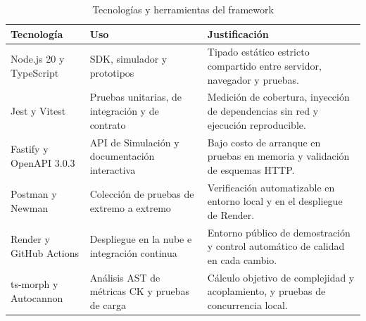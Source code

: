 \begin{table}[H]
  \centering
  \small
  \renewcommand{\arraystretch}{1.2}
  \begin{tabularx}{\textwidth}{|>{\raggedright\arraybackslash}p{2.9cm}|>{\raggedright\arraybackslash}p{4.7cm}|>{\raggedright\arraybackslash}X|}
    \hline
    \textbf{Tecnología} & \textbf{Uso} & \textbf{Justificación} \\ \hline
    Node.js 20 y TypeScript & SDK, simulador y prototipos & Tipado estático estricto compartido entre servidor, navegador y pruebas. \\ \hline
    Jest y Vitest & Pruebas unitarias, de integración y de contrato & Medición de cobertura, inyección de dependencias sin red y ejecución reproducible. \\ \hline
    Fastify y OpenAPI 3.0.3 & API de Simulación y documentación interactiva & Bajo costo de arranque en pruebas en memoria y validación de esquemas HTTP. \\ \hline
    Postman y Newman & Colección de pruebas de extremo a extremo & Verificación automatizable en entorno local y en el despliegue de Render. \\ \hline
    Render y GitHub Actions & Despliegue en la nube e integración continua & Entorno público de demostración y control automático de calidad en cada cambio. \\ \hline
    ts-morph y Autocannon & Análisis AST de métricas CK y pruebas de carga & Cálculo objetivo de complejidad y acoplamiento, y pruebas de concurrencia local. \\ \hline
  \end{tabularx}
  \caption{Tecnologías y herramientas del framework}
  \label{tab:tecnologias-memoria}
\end{table}
